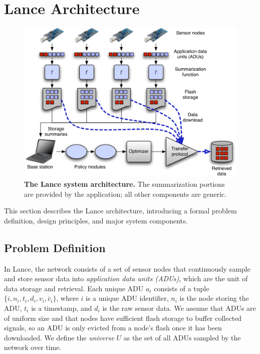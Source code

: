\section{Lance Architecture}
\label{lance-sec-architecture}

\begin{figure}[t]
\begin{center}
\includegraphics[width=1.0\hsize]{./4-lance/figs/architecture.pdf}
\end{center}

\caption{\textbf{The Lance system architecture.} The summarization portions
are provided by the application; all other components are generic.}

\label{lance-fig-architecture}
\end{figure}

This section describes the Lance architecture, introducing a formal problem
definition, design principles, and major system components.

\subsection{Problem Definition}
\label{lance-sec-problem-definition}

In Lance, the network consists of a set of sensor nodes that continuously
sample and store sensor data into \textit{application data units (ADUs)},
which are the unit of data storage and retrieval. Each unique ADU $a_i$
consists of a tuple $\{ i, n_i, t_i, d_i, v_i, \bar{c}_i \}$, where $i$ is a
unique ADU identifier, $n_i$ is the node storing the ADU, $t_i$ is a
timestamp, and $d_i$ is the raw sensor data. We assume that ADUs are of
uniform size and that nodes have sufficient flash storage to buffer collected
signals, so an ADU is only evicted from a node's flash once it has been
downloaded. We define the \textit{universe} $U$ as the set of all ADUs
sampled by the network over time. 

